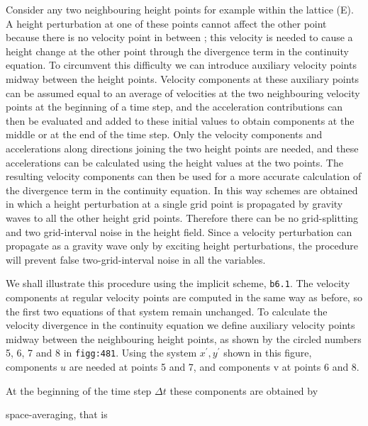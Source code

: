 Consider any two neighbouring height points for example within the
lattice (E). A height perturbation at one of these points cannot affect
the other point because there is no velocity point in between ; this
velocity is needed to cause a height change at the other point through
the divergence term in the continuity equation. To circumvent this
difficulty we can introduce auxiliary velocity points midway between the
height points. Velocity components at these auxiliary points can be
assumed equal to an average of velocities at the two neighbouring
velocity points at the beginning of a time step, and the acceleration
contributions can then be evaluated and added to these initial values to
obtain components at the middle or at the end of the time step. Only the
velocity components and accelerations along directions joining the two
height points are needed, and these accelerations can be calculated
using the height values at the two points. The resulting velocity
components can then be used for a more accurate calculation of the
divergence term in the continuity equation. In this way schemes are
obtained in which a height perturbation at a single grid point is
propagated by gravity waves to all the other height grid points.
Therefore there can be no grid-splitting and two grid-interval noise in
the height field. Since a velocity perturbation can propagate as a
gravity wave only by exciting height perturbations, the procedure will
prevent false two-grid-interval noise in all the variables.

We shall illustrate this procedure using the implicit scheme,
\texttt{b6.1}. The velocity components at regular velocity points are
computed in the same way as before, so the first two equations of that
system remain unchanged. To calculate the velocity divergence in the
continuity equation we define auxiliary velocity points midway between
the neighbouring height points, as shown by the circled numbers 5, 6, 7
and 8 in \texttt{figg:481}. Using the system \(x^{'},y^{'}\) shown in
this figure, components \(u\) are needed at points 5 and 7, and
components v\textquotesingle{} at points 6 and 8.

At the beginning of the time step \(\Delta t\) these components are
obtained by


space-averaging, that is

